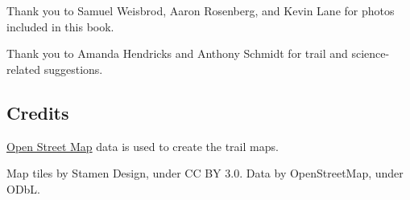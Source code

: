 \documentclass[
]{book}
\begin{document}
Thank you to Samuel Weisbrod, Aaron Rosenberg, and Kevin Lane for photos included in this book.

Thank you to Amanda Hendricks and Anthony Schmidt for trail and science-related suggestions.

\hypertarget{credits}{%
\subsection{Credits}\label{credits}}

\href{https://www.openstreetmap.org/copyright}{Open Street Map} data is used to create the trail maps.

Map tiles by Stamen Design, under CC BY 3.0. Data by OpenStreetMap, under ODbL.

  
\end{document}
